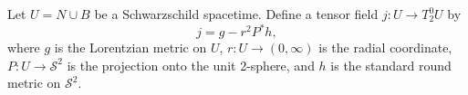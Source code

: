Let $U = N \cup B$ be a Schwarzschild spacetime. Define a tensor field $j: U \to T_2^0 U$ by
$$j = g - r^2 P^* h,$$
where $g$ is the Lorentzian metric on $U$, $r: U \to (0, \infty)$ is the radial coordinate, $P: U \to \mathcal{S}^2$ is the projection onto the unit 2-sphere, and $h$ is the standard round metric on $\mathcal{S}^2$.
